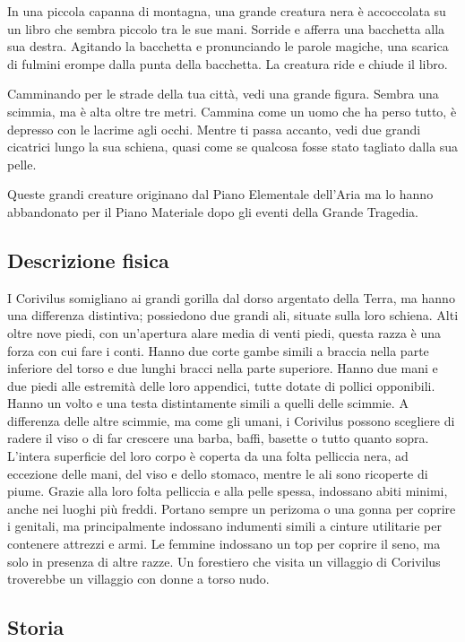 In una piccola capanna di montagna, una grande creatura nera è
accoccolata su un libro che sembra piccolo tra le sue mani. Sorride e
afferra una bacchetta alla sua destra. Agitando la bacchetta e
pronunciando le parole magiche, una scarica di fulmini erompe dalla
punta della bacchetta. La creatura ride e chiude il libro.

Camminando per le strade della tua città, vedi una grande figura. Sembra
una scimmia, ma è alta oltre tre metri. Cammina come un uomo che ha
perso tutto, è depresso con le lacrime agli occhi. Mentre ti passa
accanto, vedi due grandi cicatrici lungo la sua schiena, quasi come se
qualcosa fosse stato tagliato dalla sua pelle.

Queste grandi creature originano dal Piano Elementale dell'Aria ma lo
hanno abbandonato per il Piano Materiale dopo gli eventi della Grande
Tragedia.

\subsection{Descrizione fisica}\label{descrizione-fisica}

I Corivilus somigliano ai grandi gorilla dal dorso argentato della
Terra, ma hanno una differenza distintiva; possiedono due grandi ali,
situate sulla loro schiena. Alti oltre nove piedi, con un'apertura alare
media di venti piedi, questa razza è una forza con cui fare i conti.
Hanno due corte gambe simili a braccia nella parte inferiore del torso e
due lunghi bracci nella parte superiore. Hanno due mani e due piedi alle
estremità delle loro appendici, tutte dotate di pollici opponibili.
Hanno un volto e una testa distintamente simili a quelli delle scimmie.
A differenza delle altre scimmie, ma come gli umani, i Corivilus possono
scegliere di radere il viso o di far crescere una barba, baffi, basette
o tutto quanto sopra. L'intera superficie del loro corpo è coperta da
una folta pelliccia nera, ad eccezione delle mani, del viso e dello
stomaco, mentre le ali sono ricoperte di piume. Grazie alla loro folta
pelliccia e alla pelle spessa, indossano abiti minimi, anche nei luoghi
più freddi. Portano sempre un perizoma o una gonna per coprire i
genitali, ma principalmente indossano indumenti simili a cinture
utilitarie per contenere attrezzi e armi. Le femmine indossano un top
per coprire il seno, ma solo in presenza di altre razze. Un forestiero
che visita un villaggio di Corivilus troverebbe un villaggio con donne a
torso nudo.

\subsection{Storia}\label{storia}

